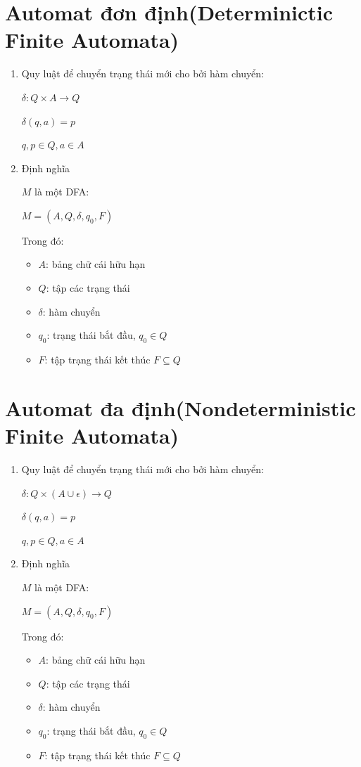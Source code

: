 \documentclass[14pt]{extreport}
\begin{document}
\section{Automat đơn định(Determinictic Finite Automata)}
\begin{enumerate}
\item Quy luật để chuyển trạng thái mới cho bởi hàm chuyển:

$\delta: Q \times A\rightarrow Q$

$\delta(q,a)=p$

$q,p\in Q,a\in A$
\item Định nghĩa

$M$ là một DFA:
\begin{center}
$M=\left(A,Q,\delta,q_0,F\right)$
\end{center}
Trong đó:
\begin{itemize}
\item $A$: bảng chữ cái hữu hạn
\item $Q$: tập các trạng thái
\item $\delta$: hàm chuyển
\item $q_0$: trạng thái bắt đầu, $q_0 \in Q$
\item $F$: tập trạng thái kết thúc $F\subseteq Q$
\end{itemize}
\end{enumerate}

\section{Automat đa định(Nondeterministic Finite Automata)}
\begin{enumerate}
\item Quy luật để chuyển trạng thái mới cho bởi hàm chuyển:

$\delta: Q \times \left(A\cup \epsilon\right) \rightarrow Q$

$\delta(q,a)=p$

$q,p\in Q,a\in A$
\item Định nghĩa

$M$ là một DFA:
\begin{center}
$M=\left(A,Q,\delta,q_0,F\right)$
\end{center}
Trong đó:
\begin{itemize}
\item $A$: bảng chữ cái hữu hạn
\item $Q$: tập các trạng thái
\item $\delta$: hàm chuyển
\item $q_0$: trạng thái bắt đầu, $q_0 \in Q$
\item $F$: tập trạng thái kết thúc $F\subseteq Q$
\end{itemize}
\end{enumerate}
\end{document}
